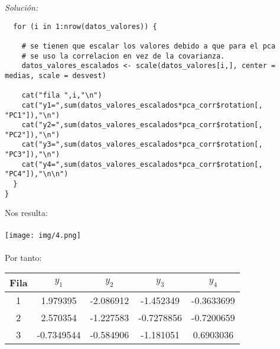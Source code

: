 \documentclass[12pt]{article}
\newenvironment{sol}
    {\emph{Solución:}
    }
    {
    }
\begin{document}
\begin{sol}
\begin{verbatim}
  for (i in 1:nrow(datos_valores)) {

    # se tienen que escalar los valores debido a que para el pca
    # se uso la correlacion en vez de la covarianza.
    datos_valores_escalados <- scale(datos_valores[i,], center = medias, scale = desvest)

    cat("fila ",i,"\n")
    cat("y1=",sum(datos_valores_escalados*pca_corr$rotation[, "PC1"]),"\n")
    cat("y2=",sum(datos_valores_escalados*pca_corr$rotation[, "PC2"]),"\n")
    cat("y3=",sum(datos_valores_escalados*pca_corr$rotation[, "PC3"]),"\n")
    cat("y4=",sum(datos_valores_escalados*pca_corr$rotation[, "PC4"]),"\n\n")
  }
}
\end{verbatim}
Nos resulta:\\\\
\texttt{[image: img/4.png]}\\\\

Por tanto: 
\begin{table}[ht]
\centering
\begin{tabular}{|c|c|c|c|c|}
\hline
\textbf{Fila} & $y_1$ & $y_2$ & $y_3$ & $y_4$ \\
\hline
1 & 1.979395 & -2.086912 & -1.452349 & -0.3633699 \\
2 & 2.570354 & -1.227583 & -0.7278856 & -0.7200659 \\
3 & -0.7349544 & -0.584906 & -1.181051 & 0.6903036 \\
\hline
\end{tabular}
\end{table}

\end{sol}



\end{document}
